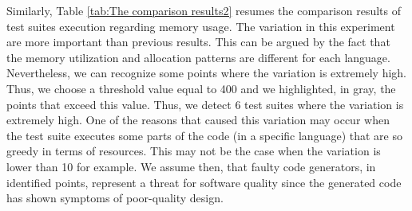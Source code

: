 Similarly, Table \ref{tab:The comparison results2} resumes the comparison results of test suites execution regarding memory usage. The variation in this experiment are more important than previous results. This can be argued by the fact that the memory utilization and allocation patterns are different for each language. Nevertheless, we can recognize some points where the variation is extremely high. Thus, we choose a threshold value equal to 400 and we highlighted, in gray, the points that exceed this value. Thus, we detect 6 test suites where the variation is extremely high. 
One of the reasons that caused this variation may occur when the test suite executes some parts of the code (in a specific language) that are so greedy in terms of resources. This may not be the case when the variation is lower than 10 for example.
We assume then, that faulty code generators, in identified points, represent a threat for software quality since the generated code has shown symptoms of poor-quality design.


